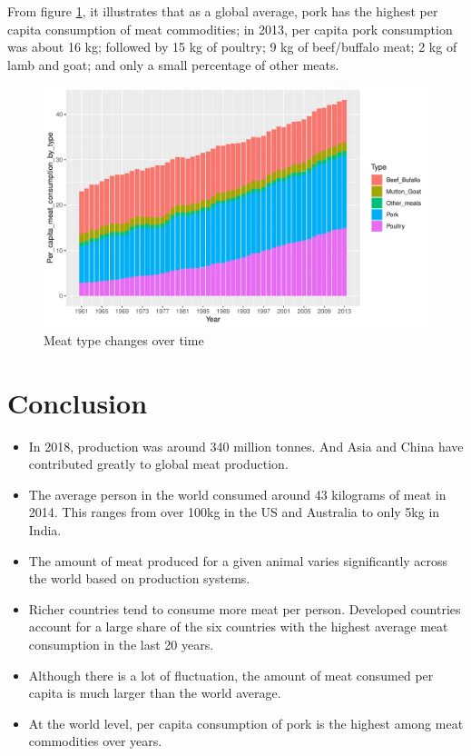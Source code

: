 \documentclass[11pt,a4paper,]{article}
\begin{document}
From figure \ref{fig:Meat-type}, it illustrates that as a global average, pork has the highest per capita consumption of meat commodities; in 2013, per capita pork consumption was about 16 kg; followed by 15 kg of poultry; 9 kg of beef/buffalo meat; 2 kg of lamb and goat; and only a small percentage of other meats.

\begin{figure}
\centering
\includegraphics{report_files/figure-latex/Meat-type-1.pdf}
\caption{\label{fig:Meat-type}Meat type changes over time}
\end{figure}

\clearpage

\hypertarget{conclusion}{%
\section{Conclusion}\label{conclusion}}

\begin{itemize}
\item
  In 2018, production was around 340 million tonnes. And Asia and China have contributed greatly to global meat production.
\item
  The average person in the world consumed around 43 kilograms of meat in 2014. This ranges from over 100kg in the US and Australia to only 5kg in India.
\item
  The amount of meat produced for a given animal varies significantly across the world based on production systems.
\item
  Richer countries tend to consume more meat per person. Developed countries account for a large share of the six countries with the highest average meat consumption in the last 20 years.
\item
  Although there is a lot of fluctuation, the amount of meat consumed per capita is much larger than the world average.
\item
  At the world level, per capita consumption of pork is the highest among meat commodities over years.
\end{itemize}
\end{document}
